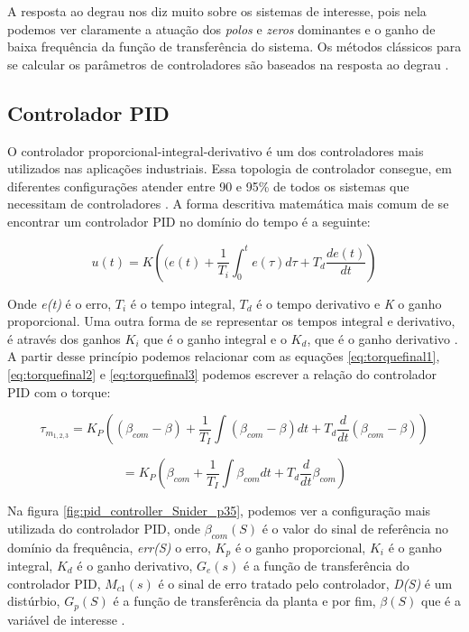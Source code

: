 A resposta ao degrau nos diz muito sobre os sistemas de interesse, pois nela podemos ver claramente a atuação dos \textit{polos} e \textit{zeros} dominantes e o ganho de baixa frequência da função de transferência do sistema. Os métodos clássicos para se calcular os parâmetros de controladores são baseados na resposta ao degrau \cite{Ogata}. 



\subsection{Controlador PID}

O controlador proporcional-integral-derivativo é um dos controladores mais utilizados nas aplicações industriais. Essa topologia de controlador consegue, em diferentes configurações atender entre 90 e 95\% de todos os sistemas que necessitam de controladores \cite{Levine1996}. A forma descritiva matemática mais comum de se encontrar um controlador PID no domínio do tempo é a seguinte:

\begin{equation}\label{eq:PID}
  u(t) = K\left((e(t)+\frac{1}{T_i}\int_{0}^{t}{e(\tau)}d\tau+T_d\frac{de(t)}{dt}\right) 
\end{equation}

Onde \textit{e(t)} é o erro, \textit{$T_i$} é o tempo integral, \textit{$T_d$} é o tempo derivativo e \textit{K} o ganho proporcional. Uma outra forma de se representar os tempos integral e derivativo, é através dos ganhos \textit{$K_i$} que é o ganho integral e o \textit{$K_d$}, que é o ganho derivativo \cite{Astrom1995}. A partir desse princípio podemos relacionar com as equações \ref{eq:torquefinal1}, \ref{eq:torquefinal2} e \ref{eq:torquefinal3} podemos escrever a relação do controlador PID com o torque:

\begin{equation}
\tau_{m_{1,2,3}}=K_{P}\left((\beta_{com}-\beta)+\frac{1}{T_{I}}\int{(\beta_{com}-\beta)dt}+T_{d}\frac{d}{dt}(\beta_{com}-\beta)\right)
\end{equation}

\begin{equation}
=K_{P}\left(\beta_{com}+\frac{1}{T_{I}}\int{\beta_{com}dt}+T_{d}\frac{d}{dt}\beta_{com}\right) 
\end{equation}

Na figura \ref{fig:pid_controller_Snider_p35}, podemos ver a configuração mais utilizada do controlador PID, onde $\beta_{com}(S)$ é o valor do sinal de referência no domínio da frequência, \textit{err(S)} o erro, \textit{$K_p$} é o ganho proporcional, \textit{$K_i$} é o ganho integral, \textit{$K_d$} é o ganho derivativo, \textit{$G_e(s)$} é a função de transferência do controlador PID, \textit{$M_{c1}(s)$} é o sinal de erro tratado pelo controlador, \textit{D(S)} é um distúrbio, \textit{$G_p(S)$} é a função de transferência da planta e por fim, \textit{$\beta(S)$} que é a variável de interesse \cite{Snider}.


